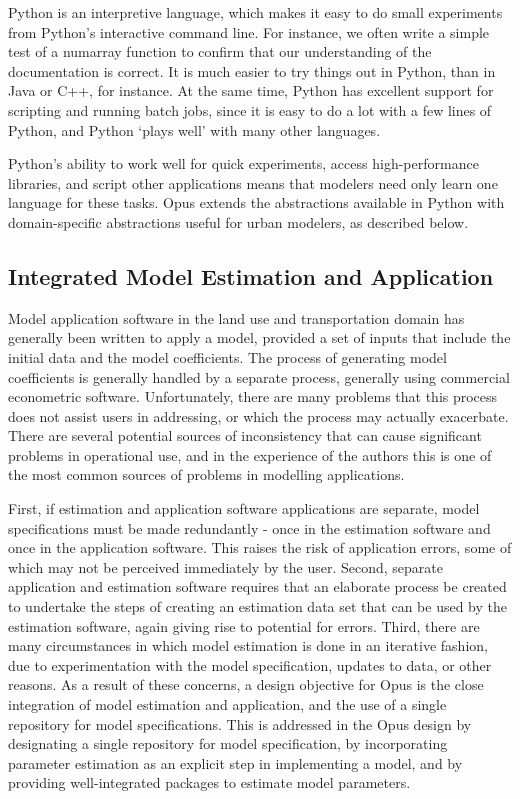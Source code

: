 Python is an interpretive language, which makes it easy to do small experiments from Python's interactive command line.  For instance, we often write a simple test of a numarray function to confirm that our understanding of the documentation is correct.  It is much easier to try things out in Python, than in Java or C++, for instance.
At the same time, Python has excellent support for scripting and running batch jobs, since it is easy to do a lot with a few lines of Python, and Python `plays well' with many other languages.  

Python's ability to work well for quick experiments, access high-performance libraries, and script other applications means that modelers need only learn one language for these tasks.
Opus extends the abstractions available in Python with domain-specific abstractions useful for urban modelers, as described below.

\subsection{Integrated Model Estimation and Application}
Model application software in the land use and transportation domain has generally been written to apply a model, provided a set of inputs that include the initial data and the model coefficients. The process of generating model coefficients is generally handled by a separate process, generally using commercial econometric software. Unfortunately, there are many problems that this process does not assist users in addressing, or which the process may actually exacerbate. There are several potential sources of inconsistency that can cause significant problems in operational use, and in the experience of the authors this is one of the most common sources of problems in modelling applications.  

First, if estimation and application software applications are separate, model specifications must be made redundantly - once in the estimation software and once in the application software.  This raises the risk of application errors, some of which may not be perceived immediately by the user. Second, separate application and estimation software requires that an elaborate process be created to undertake the steps of creating an estimation data set that can be used by the estimation software, again giving rise to potential for errors. Third, there are many circumstances in which model estimation is done in an iterative fashion, due to experimentation with the model specification, updates to data, or other reasons.  As a result of these concerns, a design objective for Opus is the close integration of model estimation and application, and the use of a single repository for model specifications.  This is addressed in the Opus design by designating a single repository for model specification, by incorporating parameter estimation as an explicit step in implementing a model, and by providing well-integrated packages to estimate model parameters.

